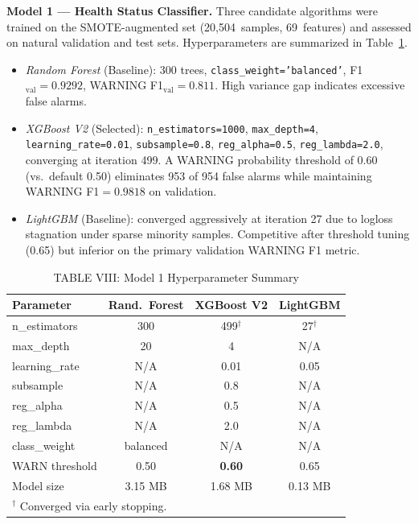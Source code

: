 \documentclass[conference]{IEEEtran}
\begin{document}
\textbf{Model 1 --- Health Status Classifier.}
Three candidate algorithms were trained on the SMOTE-augmented set
(20,504~samples, 69~features) and assessed on natural validation and test
sets. Hyperparameters are summarized in Table~\ref{tab:hyper_clf}.

\begin{itemize}
\item \textit{Random Forest} (Baseline): 300 trees,
  \texttt{class\_weight='balanced'}, F1$_\text{val}=0.9292$, WARNING
  F1$_\text{val}=0.811$. High variance gap indicates excessive false alarms.

\item \textit{XGBoost V2} (Selected): \texttt{n\_estimators=1000},
  \texttt{max\_depth=4}, \texttt{learning\_rate=0.01},
  \texttt{subsample=0.8}, \texttt{reg\_alpha=0.5}, \texttt{reg\_lambda=2.0},
  converging at iteration 499. A WARNING probability threshold of 0.60
  (vs.\ default 0.50) eliminates 953 of 954 false alarms while maintaining
  WARNING F1$=0.9818$ on validation.

\item \textit{LightGBM} (Baseline): converged aggressively at iteration 27
  due to logloss stagnation under sparse minority samples. Competitive after
  threshold tuning (0.65) but inferior on the primary validation WARNING F1
  metric.
\end{itemize}

\begin{table}[htbp]
\caption{TABLE VIII: Model 1 Hyperparameter Summary}
\centering
\begin{tabular}{p{2.2cm}ccc}
\hline
\textbf{Parameter} & \textbf{Rand.~Forest} & \textbf{XGBoost V2} & \textbf{LightGBM} \\
\hline
n\_estimators   & 300      & 499$^\dagger$ & 27$^\dagger$ \\
max\_depth      & 20       & 4             & N/A \\
learning\_rate  & N/A      & 0.01          & 0.05 \\
subsample       & N/A      & 0.8           & N/A \\
reg\_alpha      & N/A      & 0.5           & N/A \\
reg\_lambda     & N/A      & 2.0           & N/A \\
class\_weight   & balanced & N/A           & N/A \\
WARN threshold  & 0.50     & \textbf{0.60} & 0.65 \\
Model size      & 3.15 MB  & 1.68 MB       & 0.13 MB \\
\hline
\multicolumn{4}{l}{$^\dagger$ Converged via early stopping.} \\
\hline
\end{tabular}
\label{tab:hyper_clf}
\end{table}
\end{document}
